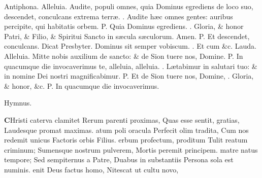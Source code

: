 \documentclass[letter,11pt]{book}
\makeatletter
\DeclareRobustCommand{\Vbar}{\vers@resp{-0.1em}{V}}
\DeclareRobustCommand{\Rbar}{\vers@resp{0pt}{R}}
\newcommand{\vers@resp@sym}{\raisebox{0.2ex}{\rotatebox[origin=c]{-20}{$\m@th\rceil$}}}
\newcommand{\vers@resp}[2]{%
  {\ooalign{\hidewidth\kern#1\vers@resp@sym\hidewidth\cr#2\cr}}%
}%
\def\P{\color{Red} P. \color{black}}
\def\V{\color{Red} \Vbar . \color{black}}
\def\R{\color{Red} \Rbar . \color{black}}
\makeatother
\begin{document}
\begin{multicols}{2}
\newline \color{Red} Antiphona. \color{black} Alleluia. Audite, populi omnes, quia Dominus egrediens de loco suo, descendet, conculcans extrema terr\ae . \V Audite h\ae c omnes gentes: auribus percipite, qui habitatis orbem. \P Quia Dominus egrediens. \V Gloria, \& honor Patri, \& Filio, \& Spiritui Sancto in s\ae cula s\ae culorum. Amen. \P Et descendet, conculcans.
\newline \color{Red} Dicat Presbyter. \color{black} Dominus sit semper vobiscum. \R Et cum \&c.
\newline \color{Red} Lauda. \color{black} Alleluia. Mitte nobis auxilium de sancto: \& de Sion tuere nos, Domine. \P In quacumque die invocaverimus te, alleluia, alleluia. \V L\ae tabimur in salutari tuo: \& in nomine Dei nostri magnificabimur. \P Et de Sion tuere nos, Domine, \V Gloria, \& honor, \&c. \P In quacumque die invocaverimus.
\vspace{-.75em} \begin{center} \color{Red} \hypertarget{hymn.Christi}{Hymnus.} \end{center} \vspace{-.75em}
\lettrine[lines=2]{\bfseries \color{Red} C}{}Hristi caterva clamitet
\newline Rerum parenti proximas,
\newline \indent Quas esse sentit, gratias,
\newline \indent Laudesque promat maximas.
atum poli oracula
\newline \indent Perfecit olim tradita,
\newline \indent Cum nos redemit unicus
\newline \indent Factoris orbis Filius.
erbum profectum, proditum
\newline \indent Tulit reatum criminum;
\newline \indent Sumensque nostrum pulverem,
\newline \indent Mortis peremit principem.
 matre natus tempore;
\newline \indent Sed sempiternus a Patre,
\newline \indent Duabus in substantiis
\newline \indent Persona sola est numinis.
enit Deus factus homo,
\newline \indent Nitescat ut cultu novo,

\end{multicols}
\end{document}
